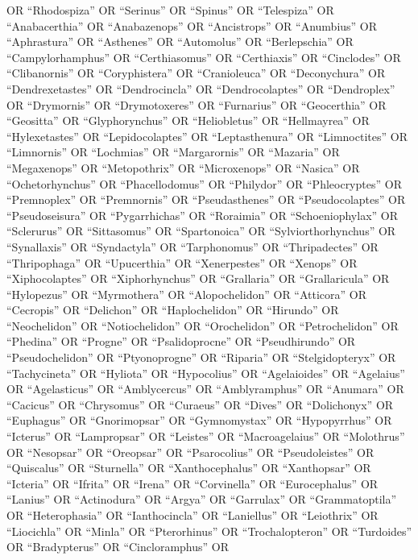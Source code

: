 \documentclass[
  number,
  review,
  onecolumn]{elsarticle}
\begin{document}
OR ``Rhodospiza'' OR ``Serinus'' OR ``Spinus'' OR ``Telespiza'' OR
``Anabacerthia'' OR ``Anabazenops'' OR ``Ancistrops'' OR ``Anumbius'' OR
``Aphrastura'' OR ``Asthenes'' OR ``Automolus'' OR ``Berlepschia'' OR
``Campylorhamphus'' OR ``Certhiasomus'' OR ``Certhiaxis'' OR
``Cinclodes'' OR ``Clibanornis'' OR ``Coryphistera'' OR ``Cranioleuca''
OR ``Deconychura'' OR ``Dendrexetastes'' OR ``Dendrocincla'' OR
``Dendrocolaptes'' OR ``Dendroplex'' OR ``Drymornis'' OR
``Drymotoxeres'' OR ``Furnarius'' OR ``Geocerthia'' OR ``Geositta'' OR
``Glyphorynchus'' OR ``Heliobletus'' OR ``Hellmayrea'' OR
``Hylexetastes'' OR ``Lepidocolaptes'' OR ``Leptasthenura'' OR
``Limnoctites'' OR ``Limnornis'' OR ``Lochmias'' OR ``Margarornis'' OR
``Mazaria'' OR ``Megaxenops'' OR ``Metopothrix'' OR ``Microxenops'' OR
``Nasica'' OR ``Ochetorhynchus'' OR ``Phacellodomus'' OR ``Philydor'' OR
``Phleocryptes'' OR ``Premnoplex'' OR ``Premnornis'' OR
``Pseudasthenes'' OR ``Pseudocolaptes'' OR ``Pseudoseisura'' OR
``Pygarrhichas'' OR ``Roraimia'' OR ``Schoeniophylax'' OR ``Sclerurus''
OR ``Sittasomus'' OR ``Spartonoica'' OR ``Sylviorthorhynchus'' OR
``Synallaxis'' OR ``Syndactyla'' OR ``Tarphonomus'' OR ``Thripadectes''
OR ``Thripophaga'' OR ``Upucerthia'' OR ``Xenerpestes'' OR ``Xenops'' OR
``Xiphocolaptes'' OR ``Xiphorhynchus'' OR ``Grallaria'' OR
``Grallaricula'' OR ``Hylopezus'' OR ``Myrmothera'' OR ``Alopochelidon''
OR ``Atticora'' OR ``Cecropis'' OR ``Delichon'' OR ``Haplochelidon'' OR
``Hirundo'' OR ``Neochelidon'' OR ``Notiochelidon'' OR ``Orochelidon''
OR ``Petrochelidon'' OR ``Phedina'' OR ``Progne'' OR ``Psalidoprocne''
OR ``Pseudhirundo'' OR ``Pseudochelidon'' OR ``Ptyonoprogne'' OR
``Riparia'' OR ``Stelgidopteryx'' OR ``Tachycineta'' OR ``Hyliota'' OR
``Hypocolius'' OR ``Agelaioides'' OR ``Agelaius'' OR ``Agelasticus'' OR
``Amblycercus'' OR ``Amblyramphus'' OR ``Anumara'' OR ``Cacicus'' OR
``Chrysomus'' OR ``Curaeus'' OR ``Dives'' OR ``Dolichonyx'' OR
``Euphagus'' OR ``Gnorimopsar'' OR ``Gymnomystax'' OR ``Hypopyrrhus'' OR
``Icterus'' OR ``Lampropsar'' OR ``Leistes'' OR ``Macroagelaius'' OR
``Molothrus'' OR ``Nesopsar'' OR ``Oreopsar'' OR ``Psarocolius'' OR
``Pseudoleistes'' OR ``Quiscalus'' OR ``Sturnella'' OR
``Xanthocephalus'' OR ``Xanthopsar'' OR ``Icteria'' OR ``Ifrita'' OR
``Irena'' OR ``Corvinella'' OR ``Eurocephalus'' OR ``Lanius'' OR
``Actinodura'' OR ``Argya'' OR ``Garrulax'' OR ``Grammatoptila'' OR
``Heterophasia'' OR ``Ianthocincla'' OR ``Laniellus'' OR ``Leiothrix''
OR ``Liocichla'' OR ``Minla'' OR ``Pterorhinus'' OR ``Trochalopteron''
OR ``Turdoides'' OR ``Bradypterus'' OR ``Cincloramphus'' OR
\end{document}
